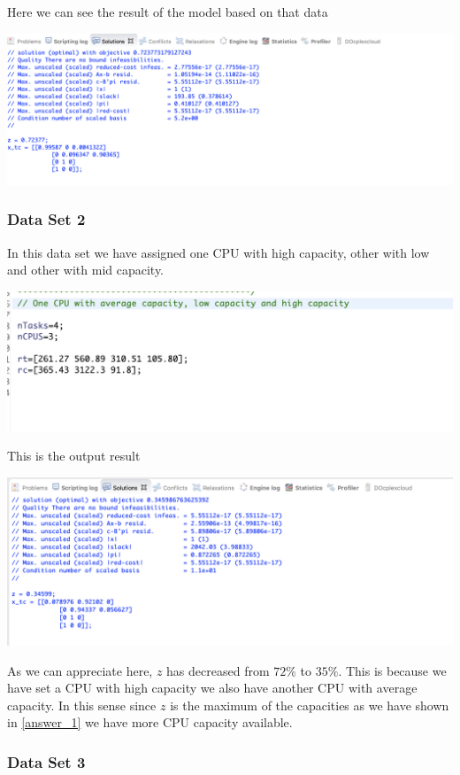 \documentclass[12pt, a4paper]{article}
\begin{document}
Here we can see the result of the model based on that data

\includegraphics[width=\textwidth]{output_default_data}

\subsubsection{Data Set 2}

In this data set we have assigned one CPU with high capacity, other with low and
other with mid capacity.

\includegraphics{data_2}

This is the output result

\includegraphics[width=\textwidth]{output_data_2}

As we can appreciate here, $z$ has decreased from $72\% $ to $35\%$. This is
because we have set a CPU with high capacity we also have another CPU with
average capacity. In this sense since $z$ is the maximum of the capacities as we
have shown in \ref{answer_1} we have more CPU capacity available.

\subsubsection{Data Set 3}
\end{document}
